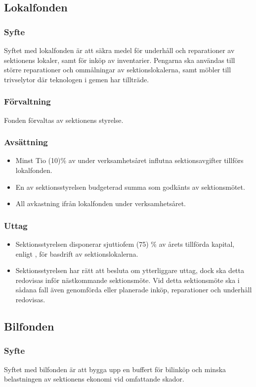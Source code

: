 \documentclass[a4paper]{dtek}
\begin{document}
\subsection{Lokalfonden}
\subsubsection{Syfte}
\label{sec:lokalfond_syfte}
Syftet med lokalfonden är att säkra medel för underhåll och reparationer av sektionens lokaler, samt för inköp av inventarier. Pengarna ska användas till större reparationer och ommålningar av sektionslokalerna, samt möbler till trivselytor där teknologen i gemen har tillträde.
\subsubsection{Förvaltning}
Fonden förvaltas av sektionens styrelse.
\subsubsection{Avsättning}
\label{sec:lokalfond_avsattning}
\begin{itemize}
\item Minst Tio (10)\% av under verksamhetsåret influtna sektionsavgifter tillförs lokalfonden.
\item En av sektionsstyrelsen budgeterad summa som godkänts av sektionsmötet.
\item All avkastning ifrån lokalfonden under verksamhetsåret.
\end{itemize}
\subsubsection{Uttag}
\begin{itemize}
\item Sektionsstyrelsen disponerar sjuttiofem (75) \% av årets tillförda kapital, enligt , för basdrift av sektionslokalerna.
\item Sektionsstyrelsen har rätt att besluta om ytterliggare uttag, dock ska detta redovisas inför nästkommande sektionsmöte. Vid detta sektionsmöte ska i sådana fall även genomförda eller planerade inköp, reparationer och underhåll redovisas.
\end{itemize}

\subsection{Bilfonden}
\subsubsection{Syfte}
\label{sec:bilfond_syfte}
Syftet med bilfonden är att bygga upp en buffert för bilinköp och minska belastningen av sektionens ekonomi vid omfattande skador.
\end{document}
